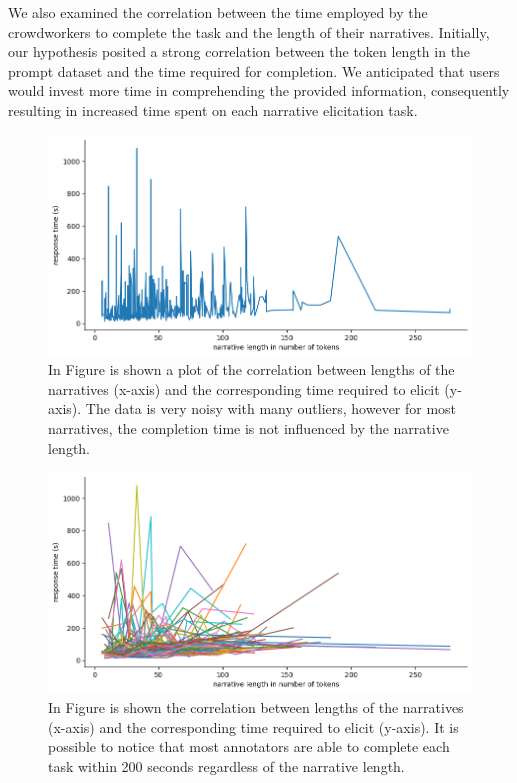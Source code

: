 We also examined the correlation between the time employed by the crowdworkers to complete the task and the length of their narratives. Initially, our hypothesis posited a strong correlation between the token length in the prompt dataset and the time required for completion. We anticipated that users would invest more time in comprehending the provided information, consequently resulting in increased time spent on each narrative elicitation task.
\begin{figure}[!htbp]
    \centering
    \includegraphics[width=1\linewidth]{assets//imgs/dataset-pearson-correlation.png}
    \caption{In Figure is shown a plot of the correlation between lengths of the narratives (x-axis) and the corresponding time required to elicit (y-axis). The data is very noisy with many outliers, however for most narratives, the completion time is not influenced by the narrative length.}
    \label{fig:dataset-pearson-correlation}
\end{figure}
\begin{figure}[!htbp]
    \centering
        \includegraphics[width=1\linewidth]{assets//imgs/dataset-overall-correlation-workers.png}
        \caption{In Figure is shown the correlation between lengths of the narratives (x-axis) and the corresponding time required to elicit (y-axis). It is possible to notice that most annotators are able to complete each  task within 200 seconds regardless of the narrative length.}
        \label{fig:dataset-overall-correlation-workers}
\end{figure}
